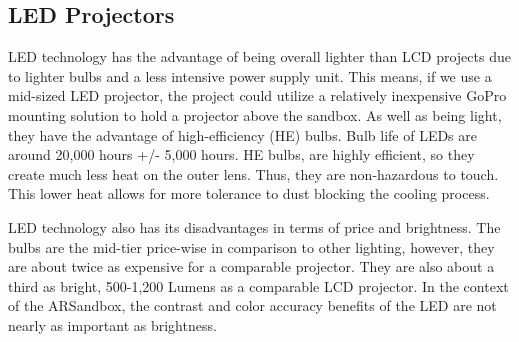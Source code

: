 \documentclass[IEEEtran]{article}
\begin{document}
\subsection{LED Projectors}
\par LED technology has the advantage of being overall lighter than LCD projects due to lighter bulbs and a less intensive power supply unit. This means, if we use a mid-sized LED projector, the project could utilize a relatively inexpensive GoPro mounting solution to hold a projector above the sandbox. As well as being light, they have the advantage of high-efficiency (HE) bulbs. Bulb life of LEDs are around 20,000 hours +/- 5,000 hours.\cite{3} HE bulbs, are highly efficient, so they create much less heat on the outer lens. Thus, they are non-hazardous to touch. This lower heat allows for more tolerance to dust blocking the cooling process. 
\par LED technology also has its disadvantages in terms of price and brightness. The bulbs are the mid-tier price-wise in comparison to other lighting, however, they are about twice as expensive for a comparable projector. They are also about a third as bright, 500-1,200 Lumens as a comparable LCD projector. In the context of the ARSandbox, the contrast and color accuracy benefits of the LED are not nearly as important as brightness. 
\end{document}
